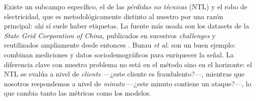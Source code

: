 Existe un subcampo específico, el de las \emph{pérdidas no técnicas} (NTL) y el robo de electricidad, que es metodológicamente distinto al nuestro por una razón principal: ahí sí suele haber etiquetas. La fuente más usada son los datasets de la \textit{State Grid Corporation of China}, publicados en sucesivos \textit{challenges} y reutilizados ampliamente desde entonces \cite{zheng2018wide}. Buzau \emph{et al.} \cite{buzau2020hybrid} son un buen ejemplo: combinan mediciones y datos sociodemográficos para enriquecer la señal. La diferencia clave con nuestro problema no está en el método sino en el horizonte: el NTL se evalúa a nivel de \emph{cliente} ---¿este cliente es fraudulento?---, mientras que nosotros respondemos a nivel de \emph{minuto} ---¿este minuto contiene un ataque?---, lo que cambia tanto las métricas como los modelos.

